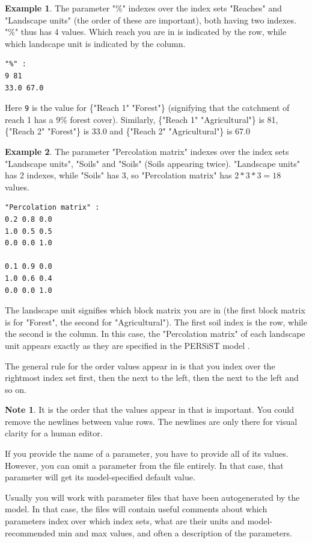 \documentclass[11pt]{article}
\theoremstyle{definition}
\newtheorem{mynote}{Note}
\newenvironment{note}%
  {\begin{lrbox}{\notebox}%
   \begin{minipage}{\dimexpr\linewidth-2\fboxsep}
   \begin{mynote}}%
  {\end{mynote}%
   \end{minipage}%
   \end{lrbox}%
   \begin{trivlist}
     \item[]\colorbox{silver}{\usebox\notebox}
   \end{trivlist}}
\newtheorem{myexample}{Example}
\newenvironment{example}%
  {\begin{lrbox}{\examplebox}%
   \begin{minipage}{\dimexpr\linewidth-2\fboxsep}
   \begin{myexample}}%
  {\end{myexample}%
   \end{minipage}%
   \end{lrbox}%
   \begin{trivlist}
     \item[]\colorbox{silver}{\usebox\examplebox}
   \end{trivlist}}
\begin{document}
\begin{example}
The parameter "\%" indexes over the index sets "Reaches" and "Landscape units" (the order of these are important), both having two indexes. "\%" thus has 4 values. Which reach you are in is indicated by the row, while which landscape unit is indicated by the column.
\begin{lstlisting}
"%" :
9 81
33.0 67.0
\end{lstlisting}
Here {\tt 9} is the value for \{"Reach 1" "Forest"\} (signifying that the catchment of reach 1 has a 9\% forest cover). Similarly, \{"Reach 1" "Agricultural"\} is 81, \{"Reach 2" "Forest"\} is 33.0 and \{"Reach 2" "Agricultural"\} is 67.0
\end{example}

\begin{example}
The parameter "Percolation matrix" indexes over the index sets "Landscape units", "Soils" and "Soils" (Soils appearing twice). "Landscape units" has 2 indexes, while "Soils" has 3, so "Percolation matrix" has $2*3*3=18$ values.
\begin{lstlisting}
"Percolation matrix" :
0.2 0.8 0.0
1.0 0.5 0.5
0.0 0.0 1.0

0.1 0.9 0.0
1.0 0.6 0.4
0.0 0.0 1.0
\end{lstlisting}
The landscape unit signifies which block matrix you are in (the first block matrix is for "Forest", the second for "Agricultural"). The first soil index is the row, while the second is the column. In this case, the "Percolation matrix" of each landscape unit appears exactly as they are specified in the PERSiST model \cite{futter14}.
\end{example}

The general rule for the order values appear in is that you index over the rightmost index set first, then the next to the left, then the next to the left and so on.

\begin{note}
It is the order that the values appear in that is important. You could remove the newlines between value rows. The newlines are only there for visual clarity for a human editor.
\end{note}

If you provide the name of a parameter, you have to provide all of its values. However, you can omit a parameter from the file entirely. In that case, that parameter will get its model-specified default value.

Usually you will work with parameter files that have been autogenerated by the model. In that case, the files will contain useful comments about which parameters index over which index sets, what are their units and model-recommended min and max values, and often a description of the parameters.
\end{document}
